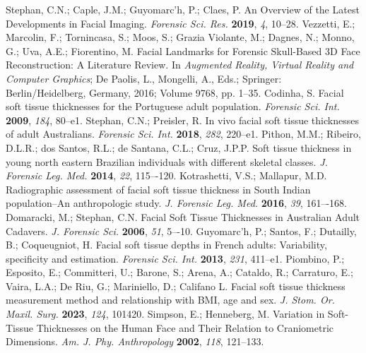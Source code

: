 \documentclass[journal,article,submit,pdftex,moreauthors]{Definitions/mdpi}
\begin{document}
\begin{thebibliography}{999}
Stephan, C.N.; Caple, J.M.; Guyomarc’h, P.; Claes, P. An Overview of the Latest Developments in Facial Imaging. {\em Forensic Sci. Res.} {\bf 2019}, {\em 4}, 10--28.
Vezzetti, E.; Marcolin, F.; Tornincasa, S.; Moos, S.; Grazia Violante, M.; Dagnes, N.; Monno, G.; Uva, A.E.; Fiorentino, M. Facial Landmarks for Forensic Skull-Based 3D Face Reconstruction: A Literature Review. In {\em Augmented Reality, Virtual Reality and Computer Graphics}; De Paolis, L., Mongelli, A., Eds.; Springer: Berlin/Heidelberg, Germany, 2016; Volume 9768, pp. 1--35.
Codinha, S. Facial soft tissue thicknesses for the Portuguese adult population. {\em Forensic Sci. Int.} {\bf 2009}, {\em 184}, 80--e1.
Stephan, C.N.; Preisler, R. In vivo facial soft tissue thicknesses of adult Australians. {\em Forensic Sci. Int.} {\bf 2018}, {\em 282}, 220--e1.
Pithon, M.M.; Ribeiro, D.L.R.; dos Santos, R.L.; de Santana, C.L.; Cruz, J.P.P. Soft tissue thickness in young north eastern Brazilian individuals with different skeletal classes. {\em J. Forensic Leg. Med.} {\bf 2014}, {\em 22}, 115–-120.
Kotrashetti, V.S.; Mallapur, M.D. Radiographic assessment of facial soft tissue thickness in South Indian population--An anthropologic study. {\em J. Forensic Leg. Med.} {\bf 2016}, {\em 39}, 161–-168.
Domaracki, M.; Stephan, C.N. Facial Soft Tissue Thicknesses in Australian Adult Cadavers. {\em J. Forensic Sci.} {\bf 2006}, {\em 51}, 5–-10.
Guyomarc’h, P.; Santos, F.; Dutailly, B.; Coqueugniot, H. Facial soft tissue depths in French adults: Variability, specificity and estimation. {\em Forensic Sci. Int.} {\bf 2013}, {\em 231}, 411--e1.
Piombino, P.; Esposito, E.; Committeri, U.; Barone, S.; Arena, A.; Cataldo, R.; Carraturo, E.; Vaira, L.A.; De Riu, G.; Mariniello, D.; Califano L. Facial soft tissue thickness measurement method and relationship with BMI, age and sex. {\em J. Stom. Or. Maxil. Surg.} {\bf 2023}, {\em 124}, 101420.
Simpson, E.; Henneberg, M. Variation in Soft-Tissue Thicknesses on the Human Face and Their Relation to Craniometric Dimensions. {\em Am. J. Phy. Anthropology} {\bf 2002}, {\em 118}, 121--133.

\end{thebibliography}
\end{document}
